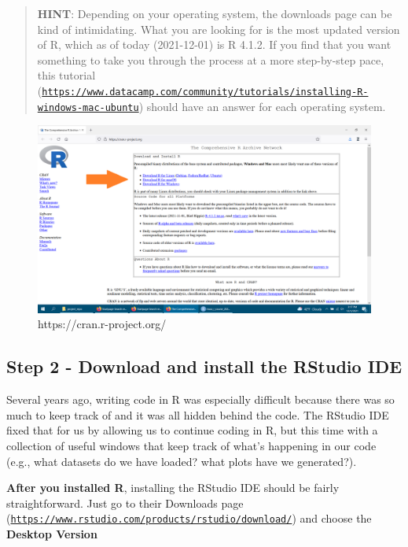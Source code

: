 \documentclass[
]{book}
\begin{document}
\begin{quote}
\textbf{HINT}: Depending on your operating system, the downloads page can be kind of intimidating. What you are looking for is the most updated version of R, which as of today (2021-12-01) is R 4.1.2. If you find that you want something to take you through the process at a more step-by-step pace, this tutorial (\href{https://www.datacamp.com/community/tutorials/installing-R-windows-mac-ubuntu}{\texttt{https://www.datacamp.com/community/tutorials/installing-R-windows-mac-ubuntu}}) should have an answer for each operating system.
\end{quote}

\begin{figure}

{\centering \includegraphics[width=0.8\linewidth]{images/cran_download_instruction} 

}

\caption{https://cran.r-project.org/}\label{fig:unnamed-chunk-2}
\end{figure}

\hypertarget{step-2---download-and-install-the-rstudio-ide}{%
\subsection{Step 2 - Download and install the RStudio IDE}\label{step-2---download-and-install-the-rstudio-ide}}

Several years ago, writing code in R was especially difficult because there was so much to keep track of and it was all hidden behind the code. The RStudio IDE fixed that for us by allowing us to continue coding in R, but this time with a collection of useful windows that keep track of what's happening in our code (e.g., what datasets do we have loaded? what plots have we generated?).

\textbf{After you installed R}, installing the RStudio IDE should be fairly straightforward. Just go to their Downloads page (\href{https://www.rstudio.com/products/rstudio/download/}{\texttt{https://www.rstudio.com/products/rstudio/download/}}) and choose the \textbf{Desktop Version}
\end{document}
